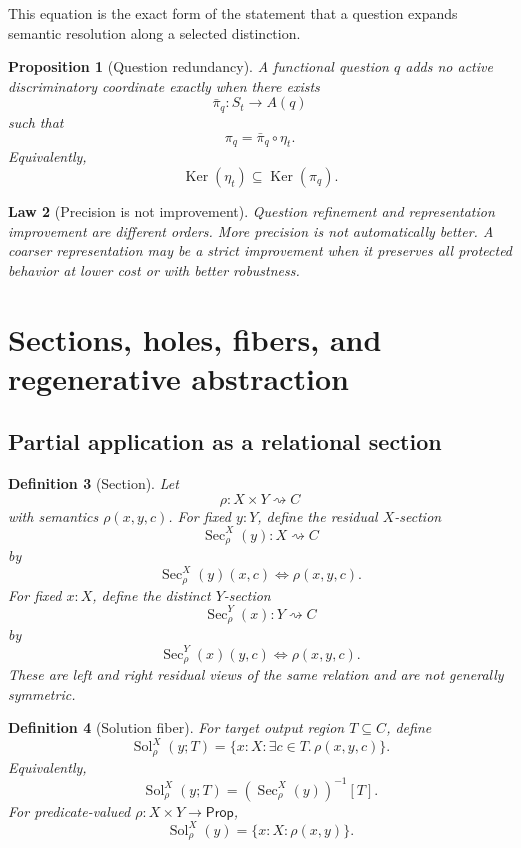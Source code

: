 \documentclass[11pt,oneside]{article}
\newtheorem{definition}{Definition}[section]
\newtheorem{law}[definition]{Law}
\newtheorem{proposition}[definition]{Proposition}
\newcommand{\Prop}{\mathsf{Prop}}
\newcommand{\Ker}{\operatorname{Ker}}
\begin{document}
This equation is the exact form of the statement that a question expands semantic resolution along a selected distinction.

\begin{proposition}[Question redundancy]
A functional question \(q\) adds no active discriminatory coordinate exactly when there exists
\[
\bar\pi_q:S_t\to A(q)
\]
such that
\[
\boxed{
\pi_q=\bar\pi_q\circ\eta_t.
}
\]
Equivalently,
\[
\Ker(\eta_t)\subseteq\Ker(\pi_q).
\]
\end{proposition}

\begin{law}[Precision is not improvement]
Question refinement and representation improvement are different orders.  More precision is not automatically better.  A coarser representation may be a strict improvement when it preserves all protected behavior at lower cost or with better robustness.
\end{law}


\section{Sections, holes, fibers, and regenerative abstraction}

\subsection{Partial application as a relational section}

\begin{definition}[Section]
Let
\[
\rho:X\times Y\rightsquigarrow C
\]
with semantics \(\rho(x,y,c)\).  For fixed \(y:Y\), define the residual \(X\)-section
\[
\boxed{
\operatorname{Sec}^{X}_{\rho}(y):X\rightsquigarrow C
}
\]
by
\[
\operatorname{Sec}^{X}_{\rho}(y)(x,c)
\iff
\rho(x,y,c).
\]
For fixed \(x:X\), define the distinct \(Y\)-section
\[
\boxed{
\operatorname{Sec}^{Y}_{\rho}(x):Y\rightsquigarrow C
}
\]
by
\[
\operatorname{Sec}^{Y}_{\rho}(x)(y,c)
\iff
\rho(x,y,c).
\]
These are left and right residual views of the same relation and are not generally symmetric.
\end{definition}

\begin{definition}[Solution fiber]
For target output region \(T\subseteq C\), define
\[
\boxed{
\operatorname{Sol}^{X}_{\rho}(y;T)
=
\{x:X:\exists c\in T.\,\rho(x,y,c)\}.
}
\]
Equivalently,
\[
\operatorname{Sol}^{X}_{\rho}(y;T)
=
\left(\operatorname{Sec}^{X}_{\rho}(y)\right)^{-1}[T].
\]
For predicate-valued \(\rho:X\times Y\to\Prop\),
\[
\operatorname{Sol}^{X}_{\rho}(y)
=
\{x:X:\rho(x,y)\}.
\]
\end{definition}
\end{document}
